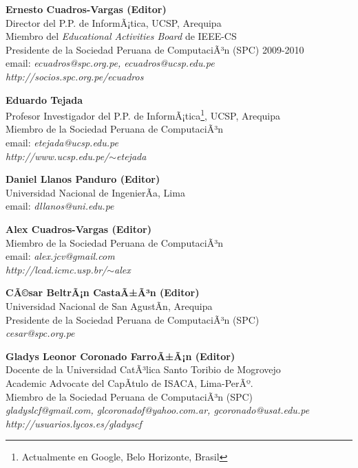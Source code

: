 \begin{center}
\textbf{Ernesto Cuadros-Vargas (Editor)}\\
Director del P.P. de InformÃ¡tica, UCSP, Arequipa\\
Miembro del \textit{Educational Activities Board} de IEEE-CS\\
Presidente de la Sociedad Peruana de ComputaciÃ³n (SPC) 2009-2010\\
email: \textit{ecuadros@spc.org.pe, ecuadros@ucsp.edu.pe}\\
\textit{http://socios.spc.org.pe/ecuadros}
\end{center}

\begin{center}
\textbf{Eduardo Tejada}\\
Profesor Investigador del P.P. de InformÃ¡tica\footnote{Actualmente en Google, Belo Horizonte, Brasil}, UCSP, Arequipa\\
Miembro de la Sociedad Peruana de ComputaciÃ³n\\
email: \textit{etejada@ucsp.edu.pe}\\
\textit{http://www.ucsp.edu.pe/$\sim$etejada}
\end{center}

\begin{center}
\textbf{Daniel Llanos Panduro (Editor)}\\
Universidad Nacional de IngenierÃ­a, Lima\\
email: \textit{dllanos@uni.edu.pe}\\
\end{center}

\begin{center}
\textbf{Alex Cuadros-Vargas (Editor)}\\
Miembro de la Sociedad Peruana de ComputaciÃ³n\\
email: \textit{alex.jcv@gmail.com}\\
\textit{http://lcad.icmc.usp.br/$\sim$alex}
\end{center}

\begin{center}
\textbf{CÃ©sar BeltrÃ¡n CastaÃ±Ã³n (Editor)}\\
Universidad Nacional de San AgustÃ­n, Arequipa\\
Presidente de la Sociedad Peruana de ComputaciÃ³n (SPC)\\
\textit{cesar@spc.org.pe}
\end{center}

\begin{center}
\textbf{Gladys Leonor Coronado FarroÃ±Ã¡n (Editor)}\\
Docente de la Universidad CatÃ³lica Santo Toribio de Mogrovejo\\
Academic Advocate del CapÃ­tulo de ISACA, Lima-PerÃº.\\
Miembro de la Sociedad Peruana de ComputaciÃ³n (SPC)\\
\textit{gladyslcf@gmail.com, glcoronadof@yahoo.com.ar, gcoronado@usat.edu.pe}\\
\textit{http://usuarios.lycos.es/gladyscf}
\end{center}

